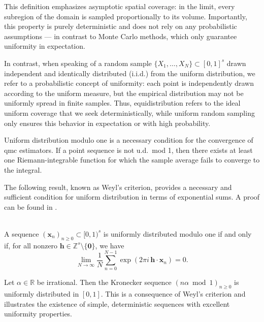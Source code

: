 This definition emphasizes asymptotic spatial coverage: in the limit, every
subregion of the domain is sampled proportionally to its volume. Importantly,
this property is purely deterministic and does not rely on any probabilistic
assumptions — in contrast to Monte Carlo methods, which only guarantee
uniformity in expectation.

In contrast, when speaking of a random sample $\{X_1, \dots, X_N\} \subset
[0,1]^s$ drawn independent and identically distributed (i.i.d.) from the uniform
distribution, we refer to a probabilistic concept of uniformity: each point is
independently drawn according to the uniform measure, but the empirical
distribution may not be uniformly spread in finite samples. Thus,
equidistribution refers to the ideal uniform coverage that we seek
deterministically, while uniform random sampling only ensures this behavior in
expectation or with high probability.

\begin{remark}
    Uniform distribution modulo one is a necessary condition for the convergence
    of \ac{qmc} estimators. If a point sequence is not u.d.\ mod 1, then there
    exists at least one Riemann-integrable function for which the sample average
    fails to converge to the integral.
\end{remark}

The following result, known as Weyl's criterion, provides a necessary and
sufficient condition for uniform distribution in terms of exponential sums. A
proof can be found in \cite{leobacher2014introduction}.

\begin{theorem} \ \\
A sequence $(\boldsymbol{x}_n)_{n \geq 0} \subset [0,1)^s$ is uniformly distributed modulo one if and only if, for all nonzero $\boldsymbol{h} \in \mathbb{Z}^s \setminus \{\boldsymbol{0}\}$, we have
\begin{equation*}
    \lim_{N \to \infty} \frac{1}{N} \sum_{n=0}^{N-1} \exp(2\pi i\, \boldsymbol{h} \cdot \boldsymbol{x}_n) = 0.
\end{equation*}
\end{theorem}

\begin{example}
Let $\alpha \in \mathbb{R}$ be irrational. Then the Kronecker sequence $(n \alpha \bmod 1)_{n \geq 0}$ is uniformly distributed in $[0,1]$. This is a consequence of Weyl's criterion and illustrates the existence of simple, deterministic sequences with excellent uniformity properties.
\end{example}

